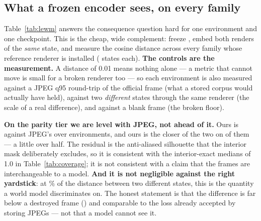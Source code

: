 \documentclass{article}
\begin{document}
\subsection{What a frozen encoder sees, on every family}
\label{sec:dino}

Table~\ref{tab:lewm} answers the consequence question hard for one environment
and one checkpoint. This is the cheap, wide complement: freeze
\seDinoModel{}, embed both renders of the \emph{same} state, and measure the
cosine distance across every family whose reference renderer is installed
(\seDinoN{} states each). \textbf{The controls are the measurement.} A distance
of 0.01 means nothing alone --- a metric that cannot move is small for a broken
renderer too --- so each environment is also measured against a JPEG q95
round-trip of the official frame (what a stored corpus would actually have
held), against two \emph{different} states through the same renderer (the scale
of a real difference), and against a blank frame (the broken floor).

\begin{table}[t]
\centering
\caption{Median cosine distance in \seDinoModel{} feature space, by fidelity
tier. \emph{Ours} and \emph{JPEG q95} are two ways of not being the official
frame; \emph{2 states} is what a genuinely different state costs; \emph{blank}
is the floor. Split by tier and never pooled: the visual tier is a different
render of the same scene by construction, so a pooled mean would flatter it and
slander the parity tier at once.}
\label{tab:dino}
\vskip 0.06in
\footnotesize

\end{table}

\textbf{On the parity tier we are level with JPEG, not ahead of it.} Ours is
\seDinoParityOurs{} against JPEG's \seDinoParityJpeg{} over
\seDinoParityN{} environments, and ours is the closer of the two on
\seDinoParityCloser{} of them --- a little over half. The residual is the
anti-aliased silhouette that the interior mask deliberately excludes, so it is
consistent with the interior-exact medians of 1.0 in Table~\ref{tab:coverage};
it is not consistent with a claim that the frames are interchangeable to a
model. \textbf{And it is not negligible against the right yardstick}: at
\seDinoParityPctScale\% of the distance between two different states, this is
the quantity a world model discriminates on. The honest statement is that the
difference is far below a destroyed frame (\seDinoParityBlank{}) and comparable
to the loss already accepted by storing JPEGs --- not that a model cannot see
it.
\end{document}
